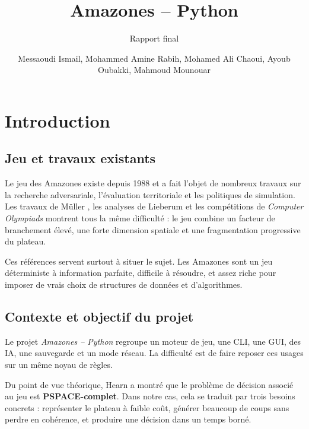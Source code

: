 \documentclass[a4paper]{article}
\title{Amazones -- Python}
\subtitle{Rapport final}
\author{Messaoudi Ismail, Mohammed Amine Rabih, Mohamed Ali Chaoui, Ayoub Oubakki, Mahmoud Mounouar}
\begin{document}

\maketitle
\thispagestyle{empty}
\tableofcontents
\newpage


\section{Introduction}

\subsection{Jeu et travaux existants}

Le jeu des Amazones existe depuis 1988 et a fait l'objet de nombreux travaux sur la recherche adversariale, l'évaluation territoriale et les politiques de simulation. Les travaux de Müller \cite{muller2002}, les analyses de Lieberum \cite{lieberum1999} et les compétitions de \textit{Computer Olympiads} montrent tous la même difficulté : le jeu combine un facteur de branchement élevé, une forte dimension spatiale et une fragmentation progressive du plateau.

Ces références servent surtout à situer le sujet. Les Amazones sont un jeu déterministe à information parfaite, difficile à résoudre, et assez riche pour imposer de vrais choix de structures de données et d'algorithmes.

\subsection{Contexte et objectif du projet}

Le projet \textit{Amazones -- Python} regroupe un moteur de jeu, une CLI, une GUI, des IA, une sauvegarde et un mode réseau. La difficulté est de faire reposer ces usages sur un même noyau de règles.

Du point de vue théorique, Hearn \cite{hearn2005} a montré que le problème de décision associé au jeu est \textbf{PSPACE-complet}. Dans notre cas, cela se traduit par trois besoins concrets : représenter le plateau à faible coût, générer beaucoup de coups sans perdre en cohérence, et produire une décision dans un temps borné.
\end{document}
